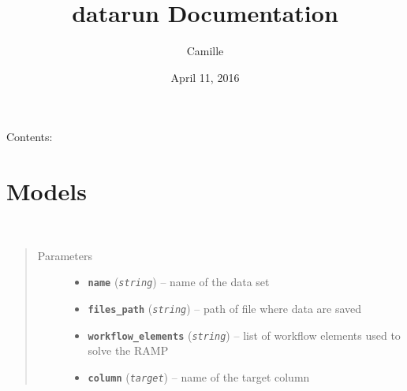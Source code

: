 \documentclass[letterpaper,10pt,english]{sphinxmanual}
\title{datarun Documentation}
\date{April 11, 2016}
\author{Camille}
\begin{document}
\maketitle
\tableofcontents
{}\label{index::doc}


Contents:


\chapter{Models}
\label{modules/models:models}\label{modules/models:module-runapp.models}\label{modules/models::doc}\label{modules/models:welcome-to-datarun-s-documentation}

\begin{fulllineitems}
\label{modules/models:runapp.models.RawData}~\begin{quote}\begin{description}
\item[{Parameters}] \leavevmode\begin{itemize}
\item {} 
\textbf{\texttt{name}} (\emph{\texttt{string}}) -- name of the data set

\item {} 
\textbf{\texttt{files\_path}} (\emph{\texttt{string}}) -- path of file where data are saved

\item {} 
\textbf{\texttt{workflow\_elements}} (\emph{\texttt{string}}) -- list of workflow elements used to solve the RAMP

\item {} 
\textbf{\texttt{column}} (\emph{\texttt{target}}) -- name of the target column

\end{itemize}

\end{description}\end{quote}

\end{fulllineitems}

\end{document}
